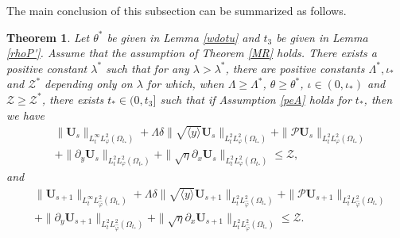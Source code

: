 \documentclass{amsart}
\numberwithin{equation}{section}
\newtheorem{theorem}{Theorem}[section]
\newcommand\y{{{\langle y \rangle}}}
\begin{document}
The main conclusion of this subsection can be summarized as follows.
\begin{theorem}\label{Phe}
Let $\theta^{*}$ be given in Lemma \ref{wdotu} and $t_{3}$ be given in Lemma \ref{rhoP'}. Assume that the assumption of Theorem \ref{MR} holds.
There exists a positive constant $\lambda^{*}$ such that for any $\lambda>\lambda^{*}$, there are positive constants $\Lambda^{*}, \iota_{*}$ and $\mathcal{Z}^{*}$ depending only on $\lambda$ for which, when $\Lambda\geq\Lambda^{*}$, $\theta\geq\theta^{*}$, $\iota\in(0,\iota_{*})$ and $\mathcal{Z}\geq\mathcal{Z}^{*}$, there exists $t_{*}\in(0,t_{3}]$ such that if Assumption \ref{peA} holds for $t_{*}$, then we have
\begin{align}\label{Hoe1}
&\|\mathbf{U}_{s}\|_{L_{t}^{\infty}L_{\varphi}^{2}(\Omega_{t_{*}})}
 +\Lambda\delta\|\sqrt{\y}\mathbf{U}_{s}\|_{L_{t}^{2}L_{\varphi}^{2}(\Omega_{t_{*}})}
 +\|\mathcal{P}\mathbf{U}_{s}\|_{L_{t}^{2}L_{\varphi}^{2}(\Omega_{t_{*}})}\\
&+\|\partial_{y}\mathbf{U}_{s}\|_{L_{t}^{2}L_{\varphi}^{2}(\Omega_{t_{*}})}
 +\|\sqrt{\eta}\partial_{x}\mathbf{U}_{s}\|_{L_{t}^{2}L_{\varphi}^{2}(\Omega_{t_{*}})}
\leq \mathcal{Z},\nonumber
\end{align}
and
\begin{align}\label{Hoe2}
&\|\mathbf{U}_{s+1}\|_{L_{t}^{\infty}L_{\hat{\varphi}}^{2}(\Omega_{t_{*}})}
 +\Lambda\delta\|\sqrt{\y}\mathbf{U}_{s+1}\|_{L_{t}^{2}L_{\hat{\varphi}}^{2}(\Omega_{t_{*}})}
 +\|\mathcal{P}\mathbf{U}_{s+1}\|_{L_{t}^{2}L_{\hat{\varphi}}^{2}(\Omega_{t_{*}})}\\
&+\|\partial_{y}\mathbf{U}_{s+1}\|_{L_{t}^{2}L_{\hat{\varphi}}^{2}(\Omega_{t_{*}})}
 +\|\sqrt{\eta}\partial_{x}\mathbf{U}_{s+1}\|_{L_{t}^{2}L_{\hat{\varphi}}^{2}(\Omega_{t_{*}})}
\leq \mathcal{Z}.\nonumber
\end{align}
\end{theorem}
\end{document}
